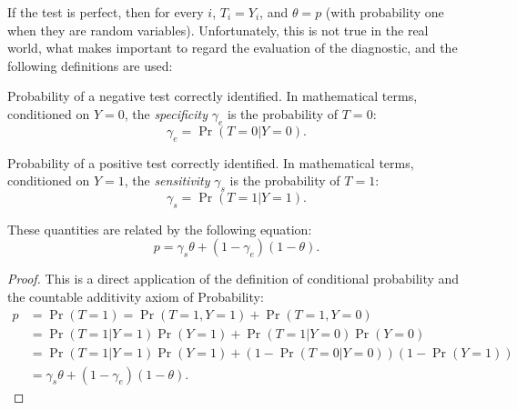 If the test is perfect, then for every $i$, $T_i = Y_i$, and
$\theta = p$ (with probability one when they are random variables).
Unfortunately, this is not true in the real world, what makes important to
regard the evaluation of the diagnostic, and the following definitions are used:

\begin{definition}[Specificity]
  Probability of a negative test correctly identified. In mathematical terms,
  conditioned on $Y = 0$, the {\em specificity} $\gamma_e$ is the probability of $T = 0$: 
  \begin{equation}
    \gamma_e = \Pr(T = 0|Y = 0). 
  \end{equation} 
\end{definition}

\begin{definition}[Sensitivity]
  Probability of a positive test correctly identified. In mathematical terms,
  conditioned on $Y = 1$, the {\em sensitivity} $\gamma_s$ is the probability of $T = 1$: 
  \begin{equation}
    \gamma_s = \Pr(T = 1|Y = 1). 
  \end{equation} 
\end{definition}

\begin{theorem} These quantities are related by the following equation:
  \begin{equation}
    p = \gamma_s\theta + (1-\gamma_e)(1-\theta).
  \end{equation}
  
\end{theorem}

\begin{proof}
  This is a direct application of the definition of conditional probability
  and the countable additivity axiom of Probability:
  \begin{equation*}
    \begin{split}
      p &= \Pr(T = 1) = \Pr(T = 1, Y = 1) + \Pr(T = 1, Y = 0) \\
      &= \Pr(T=1|Y=1)\Pr(Y=1) + \Pr(T=1|Y=0)\Pr(Y=0) \\
      &= \Pr(T=1|Y=1)\Pr(Y=1) + (1 - \Pr(T=0|Y=0))(1-\Pr(Y=1)) \\
      &= \gamma_s\theta + (1 - \gamma_e)(1-\theta).
    \end{split}
  \end{equation*} 
\end{proof}

